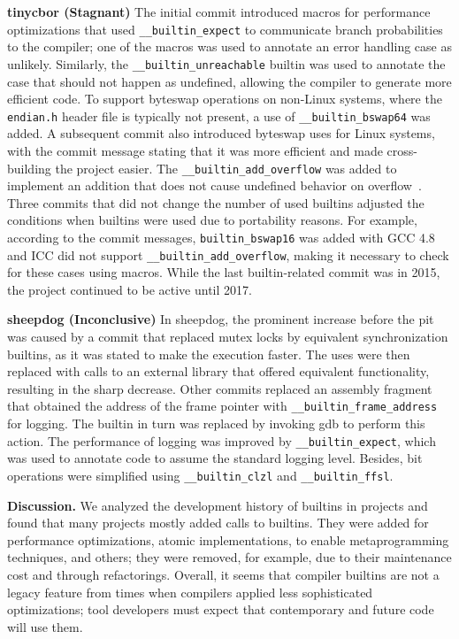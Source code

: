 \documentclass[sigconf,screen]{acmart}
\renewcommand{\paragraph}[1]{\textbf{#1}}
\newcommand\code[1]{\texttt{#1}}
\begin{document}
\paragraph{tinycbor (Stagnant)}
The initial commit introduced macros for performance optimizations that used \code{\_\_builtin\_expect} to communicate branch probabilities to the compiler; one of the macros was used to annotate an error handling case as unlikely.
Similarly, the \code{\_\_builtin\_unreachable} builtin was used to annotate the case that should not happen as undefined, allowing the compiler to generate more efficient code.
To support byteswap operations on non-Linux systems, where the \code{endian.h} header file is typically not present, a use of \code{\_\_builtin\_bswap64} was added.
A subsequent commit also introduced byteswap uses for Linux systems, with the commit message stating that it was more efficient and made cross-building the project easier.
The \code{\_\_builtin\_add\_overflow} was added to implement an addition that does not cause undefined behavior on overflow~\cite{intoverflow}.
Three commits that did not change the number of used builtins adjusted the conditions when builtins were used due to portability reasons.
For example, according to the commit messages, \code{builtin\_bswap16} was added with GCC 4.8 and ICC did not support \code{\_\_builtin\_add\_overflow}, making it necessary to check for these cases using macros.
While the last builtin-related commit was in 2015, the project continued to be active until 2017.

\paragraph{sheepdog (Inconclusive)}
In sheepdog, the prominent increase before the pit was caused by a commit that replaced mutex locks by equivalent synchronization builtins, as it was stated to make the execution faster.
The uses were then replaced with calls to an external library that offered equivalent functionality, resulting in the sharp decrease.
Other commits replaced an assembly fragment that obtained the address of the frame pointer with \code{\_\_builtin\_frame\_address} for logging.
The builtin in turn was replaced by invoking gdb to perform this action.
The performance of logging was improved by \code{\_\_builtin\_expect}, which was used to annotate code to assume the standard logging level.
Besides, bit operations were simplified using \code{\_\_builtin\_clzl} and \code{\_\_builtin\_ffsl}.

\paragraph{Discussion.}
We analyzed the development history of builtins in projects and found that many projects mostly
added calls to builtins.
They were added for performance optimizations, atomic implementations, to enable metaprogramming techniques, and others; they were removed, for example, due to their maintenance cost and through refactorings.
Overall, it seems that compiler builtins are not a legacy feature from times when compilers applied less sophisticated optimizations; tool developers must expect that contemporary and future code will use them.
\end{document}
